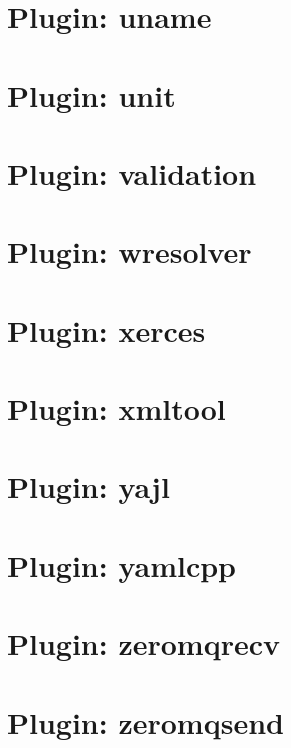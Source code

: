 \documentclass[twoside]{book}
\newcommand{\+}{\discretionary{\mbox{\scriptsize$\hookleftarrow$}}{}{}}
\begin{document}
\chapter{Plugin\+: uname}
\label{autotoc_md759}

\chapter{Plugin\+: unit}
\label{autotoc_md763}

\chapter{Plugin\+: validation}
\label{autotoc_md767}

\chapter{Plugin\+: wresolver}
\label{autotoc_md772}

\chapter{Plugin\+: xerces}
\label{autotoc_md774}

\chapter{Plugin\+: xmltool}
\label{autotoc_md781}

\chapter{Plugin\+: yajl}
\label{autotoc_md786}

\chapter{Plugin\+: yamlcpp}
\label{autotoc_md817}

\chapter{Plugin\+: zeromqrecv}
\label{autotoc_md900}

\chapter{Plugin\+: zeromqsend}
\label{autotoc_md906}

\end{document}
